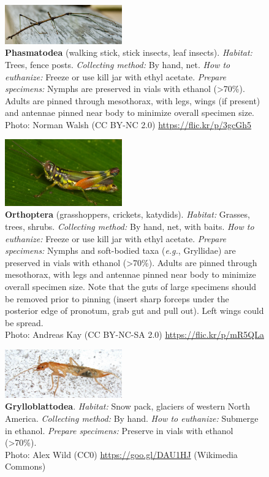 \documentclass[letterpaper, 11pt]{article}
\begin{document}
\begin{figure}
  \caption*{\textbf{Phasmatodea} (walking stick, stick insects, leaf insects). \textit{Habitat:} Trees, fence posts. \textit{Collecting method:} By hand, net. \textit{How to euthanize:} Freeze or use kill jar with ethyl acetate. \textit{Prepare specimens:} Nymphs are preserved in vials with ethanol (\textgreater70\%). Adults are pinned through mesothorax, with legs, wings (if present) and antennae pinned near body to minimize overall specimen size. \\ Photo: Norman Walsh (CC BY-NC 2.0) \url{https://flic.kr/p/3gcGh5}}
  \includegraphics[width=0.45\textwidth]{Phasmatodea}
\end{figure}

\begin{figure}
  \caption*{\textbf{Orthoptera} (grasshoppers, crickets, katydids). \textit{Habitat:} Grasses, trees, shrubs. \textit{Collecting method:} By hand, net, with baits. \textit{How to euthanize:} Freeze or use kill jar with ethyl acetate. \textit{Prepare specimens:} Nymphs and soft-bodied taxa (\textit{e.g.}, Gryllidae) are preserved in vials with ethanol (\textgreater70\%). Adults are pinned through mesothorax, with legs and antennae pinned near body to minimize overall specimen size. Note that the guts of large specimens should be removed prior to pinning (insert sharp forceps under the posterior edge of pronotum, grab gut and pull out). Left wings could be spread. \\ Photo: Andreas Kay (CC BY-NC-SA 2.0) \url{https://flic.kr/p/mR5QLa}}
  \includegraphics[width=0.45\textwidth]{Orthoptera}
\end{figure}

\clearpage

\begin{figure}
  \caption*{\textbf{Grylloblattodea}. \textit{Habitat:} Snow pack, glaciers of western North America. \textit{Collecting method:} By hand. \textit{How to euthanize:} Submerge in ethanol. \textit{Prepare specimens:} Preserve in vials with ethanol (\textgreater70\%).\\ Photo: Alex Wild (CC0) \url{https://goo.gl/DAU1HJ} (Wikimedia Commons)}
  \includegraphics[width=0.45\textwidth]{Grylloblattodea}
\end{figure}
\end{document}
